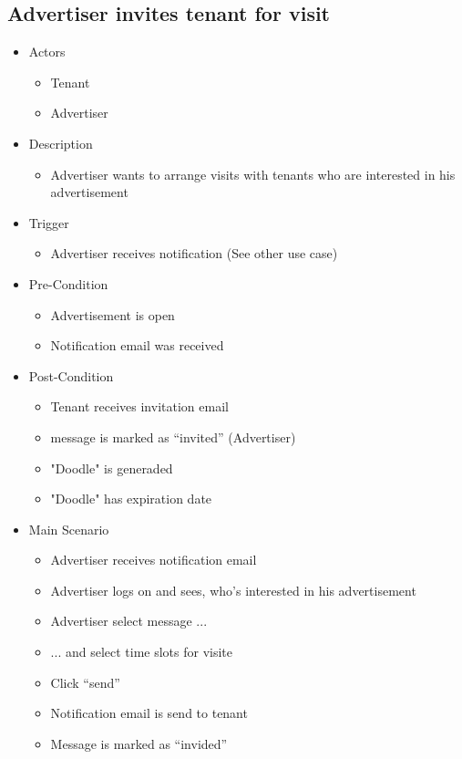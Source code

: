 \documentclass[a4paper,11pt]{article}
\begin{document}
\subsection*{Advertiser invites tenant for visit}
\begin{itemize}
  \item Actors
    \begin{itemize}
      \item Tenant
      \item Advertiser
    \end{itemize}
  \item Description
    \begin{itemize}
      \item Advertiser wants to arrange visits with tenants who are interested in his advertisement
    \end{itemize}
  \item Trigger
    \begin{itemize}
      \item Advertiser receives notification (See other use case)
    \end{itemize}
  \item Pre-Condition
    \begin{itemize}
      \item Advertisement is open
      \item Notification email was received 
    \end{itemize}
  \item Post-Condition
    \begin{itemize}
      \item Tenant receives invitation email
      \item message is marked as “invited” (Advertiser)
      \item "Doodle" is generaded
      \item "Doodle" has expiration date  
    \end{itemize}
  \item Main Scenario
    \begin{itemize}
      \item Advertiser receives notification email
      \item Advertiser logs on and sees, who's interested in his advertisement
      \item Advertiser select message ...
      \item ... and select time slots for visite
      \item Click “send”
      \item Notification email is send to tenant 
      \item Message is marked as “invided”
    \end{itemize}
  \end{itemize}
\end{document}
